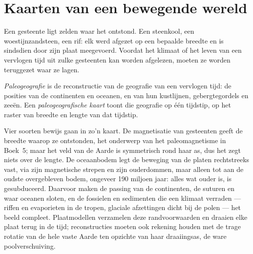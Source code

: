 \section{Kaarten van een bewegende wereld}\label{sec:b2:phanerozoic-earth:maps}

Een gesteente ligt zelden waar het ontstond. Een steenkool, een woestijnzandsteen, een rif: elk werd afgezet op
een bepaalde breedte en is sindsdien door zijn plaat meegevoerd. Voordat het klimaat of het leven van een vervlogen
tijd uit zulke gesteenten kan worden afgelezen, moeten ze worden teruggezet waar ze lagen.

\begin{definition}\label{def:b2:phanerozoic-earth:palaeogeography}
\emph{Paleogeografie} is de reconstructie van de geografie van een vervlogen
tijd: de posities van de continenten en oceanen, en van hun kustlijnen, gebergtegordels en
zeeën. Een \emph{paleogeografische kaart} toont die geografie op één
tijdstip, op het raster van breedte en lengte van dat tijdstip.
\end{definition}

Vier soorten bewijs gaan in zo'n kaart. De magnetisatie van gesteenten geeft de breedte waarop
ze ontstonden, het onderwerp van het paleomagnetisme in Boek~5; maar het veld van de Aarde is
symmetrisch rond haar as, dus het zegt niets over de lengte. De oceaanbodem legt de beweging van
de platen rechtstreeks vast, via zijn magnetische strepen en zijn ouderdommen, maar alleen tot aan de
oudste overgebleven bodem, ongeveer 190 miljoen jaar: alles wat ouder is, is gesubduceerd. Daarvoor
maken de passing van de continenten, de suturen en  waar oceanen sloten, en de fossielen en
sedimenten die een klimaat verraden --- riffen en evaporieten in de tropen, glaciale afzettingen dicht bij de
polen --- het beeld compleet. Plaatmodellen verzamelen deze randvoorwaarden en draaien elke plaat terug in de
tijd; reconstructies moeten ook rekening houden met de trage rotatie van de hele vaste Aarde ten opzichte
van haar draaiingsas, de ware poolverschuiving.

